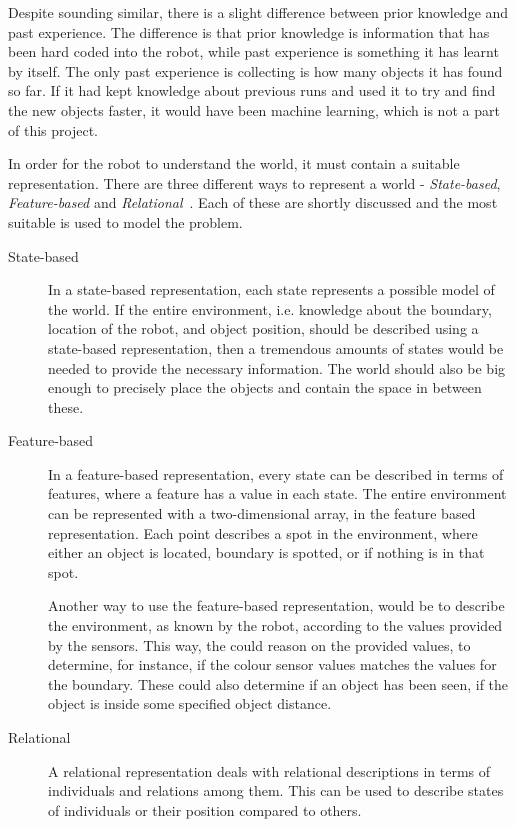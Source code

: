 Despite sounding similar, there is a slight difference between prior knowledge and past experience. The difference is that prior knowledge is information that has been hard coded into the robot, while past experience is something it has learnt by itself. The only past experience \projname{} is collecting is how many objects it has found so far. If it had kept knowledge about previous runs and used it to try and find the new objects faster, it would have been machine learning, which is not a part of this project.

In order for the robot to understand the world, it must contain a suitable representation. There are three different ways to represent a world - \emph{State-based}, \emph{Feature-based} and \emph{Relational}~\citep{artificialintelligencebook}. Each of these are shortly discussed and the most suitable is used to model the problem. 

\begin{description}
\item[State-based] In a state-based representation, each state represents a possible model of the world. If the entire environment, i.e. knowledge about the boundary, location of the robot, and object position, should be described using a state-based representation, then a  tremendous amounts of states would be needed to provide the necessary information. The world should also be big enough to precisely place the objects and contain the space in between these. 


\item[Feature-based] In a feature-based representation, every state can be described in terms of features, where a feature has a value in each state. The entire environment can be represented with a two-dimensional array, in the feature based representation. Each point describes a spot in the environment, where either an object is located, boundary is spotted, or if nothing is in that spot. 

Another way to use the feature-based representation, would be to describe the environment, as known by the robot, according to the values provided by the sensors. This way, the \projname{} could reason on the provided values, to determine, for instance, if the colour sensor values matches the values for the boundary. These could also determine if an object has been seen, if the object is inside some specified object distance. 

\item[Relational] A relational representation deals with relational descriptions in terms of individuals and relations among them. This can be used to describe states of individuals or their position compared to others. 
\end{description}

